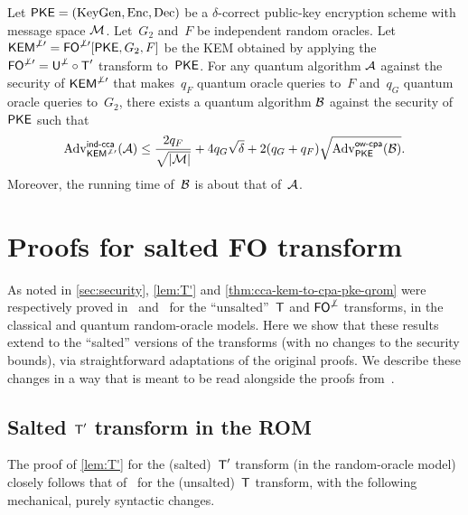 \documentclass{iacrcc}
\begin{document}
\begin{theorem}
  \label{thm:cca-kem-to-cpa-pke-qrom}
  Let $\textsf{\upshape\mdseries PKE} = (\textrm{\upshape\mdseries KeyGen},\textrm{\upshape\mdseries Enc},\textrm{\upshape\mdseries Dec})$ be a $\delta$-correct public-key
  encryption scheme with message space $\mathcal{M}$.  Let~$G_2$ and~$F$ be
  independent random oracles.  Let
  $\textsf{\upshape\mdseries KEM}^{\not\perp\prime}=\textsf{\upshape\mdseries FO}^{\not\perp\prime}[\textsf{\upshape\mdseries PKE},G_2,F]$ be the KEM obtained by applying
  the $\textsf{\upshape\mdseries FO}^{\not\perp\prime} = \textsf{\upshape\mdseries U}^{\not\perp} \circ \textsf{\upshape\mdseries T}'$ transform to~$\textsf{\upshape\mdseries PKE}$.  For any
  quantum algorithm $\mathcal{A}$ against the \INDCCA security of
  $\textsf{\upshape\mdseries KEM}^{\not\perp\prime}$ that makes~$q_F$ quantum oracle queries to~$F$
  and~$q_G$ quantum oracle queries to~$G_2$, there exists a quantum
  algorithm $\mathcal{B}$ against the \OWCPA security of $\textsf{\upshape\mdseries PKE}$ such
  that
  \[ \mathrm{Adv}^{\textsf{\upshape\mdseries \textsf{\upshape\mdseries ind-cca}}}_{\textsf{\upshape\mdseries KEM}^{\not\perp\prime}}(\mathcal{A}) \leq
    \frac{2 q_F}{\sqrt{|\mathcal{M}|}} + 4 q_G \sqrt{\delta} + 2(q_G + q_F)
    \sqrt{\mathrm{Adv}^{\textsf{\upshape\mdseries \textsf{\upshape\mdseries ow-cpa}}}_{\textsf{\upshape\mdseries PKE}}(\mathcal{B})}.\] Moreover, the running
  time of~$\mathcal{B}$ is about that of~$\mathcal{A}$.
\end{theorem}


\section{Proofs for salted FO transform}\label{sec:proofs-salted-fo}

As noted in \autoref{sec:security}, \autoref{lem:T'} and \autoref{thm:cca-kem-to-cpa-pke-qrom} were respectively proved in~\cite{TCC:HofHovKil17} and~\cite{C:JZCWM18} for the ``unsalted''~$\textsf{\upshape\mdseries T}$ and $\textsf{\upshape\mdseries FO}^{\not\perp}$ transforms, in the classical and quantum random-oracle models.
Here we show that these results extend to the ``salted'' versions of the transforms (with no changes to the security bounds), via straightforward adaptations of the original proofs.
We describe these changes in a way that is meant to be read alongside the proofs from~\cite{TCC:HofHovKil17,C:JZCWM18}.%

\subsection{Salted $\textsf{\upshape\mdseries T}'$ transform in the ROM}\label{sec:salted-T'}

\newcommand{\G}{\styleAlgorithm{G}}

The proof of \autoref{lem:T'} for the (salted)~$\textsf{\upshape\mdseries T}'$ transform (in the random-oracle model) closely follows that of~\cite[Theorems~3.1 and~3.2]{TCC:HofHovKil17} for the (unsalted)~$\textsf{\upshape\mdseries T}$ transform, with the following mechanical, purely syntactic changes.
\end{document}

